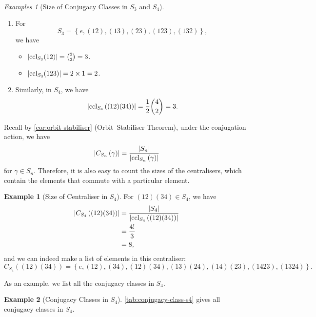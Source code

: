\documentclass{article}
\theoremstyle{definition}
\newtheorem*{example*}{Example}
\theoremstyle{remark}
\DeclarePairedDelimiter{\abs}{\lvert}{\rvert}
\newcommand{\pqty}[1]{\left(#1\right)}
\newcommand{\Bqty}[1]{\left\{#1\right\}}
\newcommand{\perm}[1]{(#1)}
\newcommand{\ccl}{\operatorname{ccl}}
\newtheorem*{examples*}{Examples}
\begin{document}
\begin{examples*}[Size of Conjugacy Classes in \(S_3\) and \(S_4\)]
    \begin{enumerate}
        \item For
        \[
            S_3 = \Bqty{e, \perm{12}, \perm{13}, \perm{23}, \perm{123}, \perm{132}},
        \]
        we have
        \begin{itemize}
            \item \(\abs{\ccl_{S_3} \perm{12}} = \binom{3}{2} = 3\).
            \item \(\abs{\ccl_{S_3} \perm{123}} = 2 \times 1 = 2\).
        \end{itemize}

        \item Similarly, in \(S_4\), we have
        \[
            \abs{\ccl_{S_4} \pqty{\perm{12} \perm{34}}} = \frac{1}{2} \binom{4}{2} = 3.
        \]
    \end{enumerate}
\end{examples*}

Recall by \autoref{cor:orbit-stabiliser} (Orbit--Stabiliser Theorem), under the conjugation action, we have
\[
    \abs{C_{S_n} \pqty{\gamma}} = \frac{\abs{S_n}}{\abs{\ccl_{S_n} \pqty{\gamma}}}
\]
for \(\gamma \in S_n\). Therefore, it is also easy to count the sizes of the centralisers, which contain the elements that commute with a particular element.

\begin{example*}[Size of Centraliser in \(S_4\)]
    For \(\perm{12}\perm{34} \in S_4\), we have
    \begin{align*}
        \abs{C_{S_4} \pqty{\perm{12} \perm{34}}} &= \frac{\abs{S_4}}{\abs{\ccl_{S_4} \pqty{\perm{12} \perm{34}}}} \\
        &= \frac{4!}{3} \\
        &= 8,
    \end{align*}
    and we can indeed make a list of elements in this centraliser:
    \[
        C_{S_4} \pqty{\perm{12}\perm{34}} = \Bqty{
            e, \perm{12}, \perm{34}, \perm{12}\perm{34}, \perm{13}\perm{24}, \perm{14}\perm{23}, \perm{1423}, \perm{1324}
        }.
    \]
\end{example*}

As an example, we list all the conjugacy classes in \(S_4\).

\begin{example*}[Conjugacy Classes in \(S_4\)]
    \autoref{tab:conjugacy-class-s4} gives all conjugacy classes in \(S_4\).
\end{example*}
\end{document}
